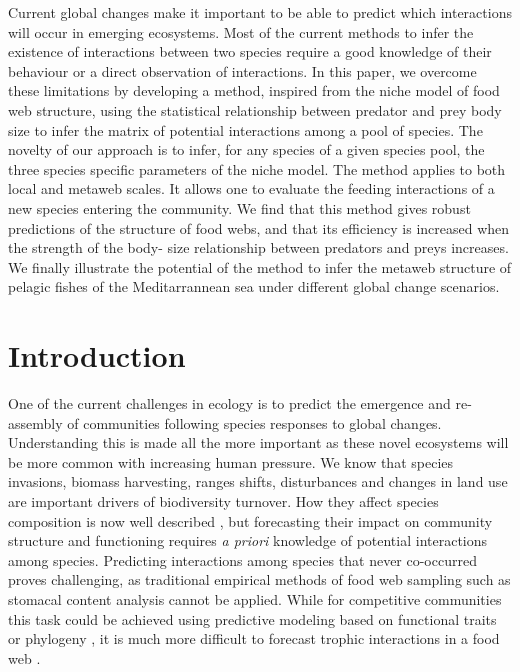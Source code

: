 \documentclass[12pt]{article}
\begin{document}
Current global changes make it important to be able to predict which
interactions will occur in emerging ecosystems. Most of the current methods to
infer the existence of interactions between two species require a good knowledge
of their behaviour or a direct observation of interactions. In this paper, we
overcome these limitations by developing a method, inspired from the niche model
of food web structure, using the statistical relationship between predator and
prey body size to infer the matrix of potential interactions among a pool of
species. The novelty of our approach is to infer, for any species of a given
species pool, the three species specific parameters of the niche model. The
method applies to both local and metaweb scales. It allows one to evaluate the
feeding interactions of a new species entering the community. We find that this
method gives robust predictions of the structure of food webs, and that its
efficiency is increased when the strength of the body- size relationship between
predators and preys increases. We finally illustrate the potential of the method
to infer the metaweb structure of pelagic fishes of the Meditarrannean sea under
different global change scenarios.

\newpage

\section{Introduction}
One of the current challenges in ecology is to predict the emergence and
re-assembly of communities following species responses to global changes.
Understanding this is made all the more important as these novel ecosystems will
be more common with increasing human pressure. We know that species invasions,
biomass harvesting, ranges shifts, disturbances and changes in land use are
important drivers of biodiversity turnover. How they affect species composition
is now well described \parencite{Pereira2010}, but forecasting their impact on
community structure and functioning requires \emph{a priori} knowledge of
potential interactions among species. Predicting interactions among species that
never co-occurred proves challenging, as traditional empirical methods of food
web sampling such as stomacal content analysis cannot be applied. While for
competitive communities this task could be achieved using predictive modeling
based on functional traits \parencite{McGill2006, Albouy2010} or phylogeny
\parencite{Cavender-Bares2009, Mouquet2012} , it is much more difficult to
forecast trophic interactions in a food web \parencite{Ings2009,
Tylianakis2008,Montoya2010}.
\end{document}
